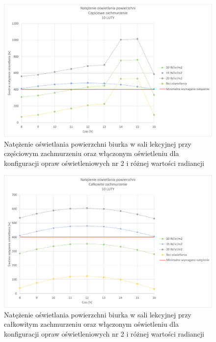 \documentclass[a4paper,12pt]{article}
\begin{document}
	\begin{figure}[!ht]
		\centering
		\includegraphics[width=\linewidth]{Wykresy/oswietlenie_2_czesciowe_zachmurzenie.pdf}
		\caption{Natężenie oświetlania powierzchni biurka w sali lekcyjnej przy częściowym zachmurzeniu  oraz włączonym oświetleniu dla konfiguracji opraw oświetleniowych nr 2 i różnej wartości radiancji}
		\label{oswietlenie_2_czesciowe_zachmurzenie}
	\end{figure}
	
	\begin{figure}[!ht]
		\centering
		\includegraphics[width=\linewidth]{Wykresy/oswietlenie_2_calkowite_zachmurzenie.pdf}
		\caption{Natężenie oświetlania powierzchni biurka w sali lekcyjnej przy całkowitym zachmurzeniu  oraz włączonym oświetleniu dla konfiguracji opraw oświetleniowych nr 2 i różnej wartości radiancji}
		\label{oswietlenie_2_calkowite_zachmurzenie}
	\end{figure}
\end{document}
